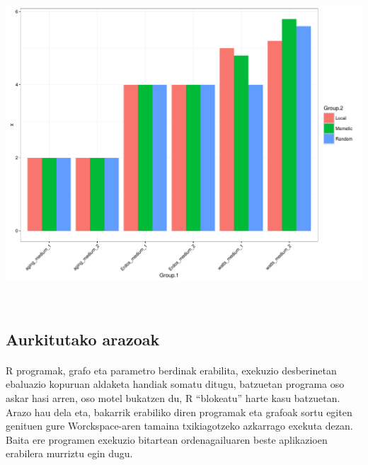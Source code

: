 \documentclass[eu,gi]{ifirak}\usepackage[]{graphicx}\usepackage[]{color}
\begin{document}
\begin{center}
\includegraphics[scale=0.6]{HistoBig.pdf} 
\end{center}
\\

\subsection{Aurkitutako arazoak}
\paragraph{}
R programak, grafo eta parametro berdinak erabilita, exekuzio desberinetan ebaluazio kopuruan aldaketa handiak somatu ditugu, batzuetan programa oso askar hasi arren, oso motel bukatzen du, R “blokeatu” harte kasu batzuetan.\\

Arazo hau dela eta, bakarrik erabiliko diren programak eta grafoak sortu egiten genituen gure Worckspace-aren tamaina txikiagotzeko azkarrago exekuta dezan. Baita ere programen exekuzio bitartean ordenagailuaren beste aplikazioen erabilera murriztu egin dugu.\\


\end{document}
